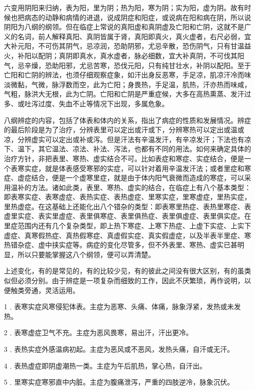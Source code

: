 \documentclass[12pt,UTF8]{ctexbook}
\begin{document}
六变用阴阳来归纳，表为阳，里为阴；热为阳，寒为阴；实为阳，虚为阴。故有时候也把病态的动静和病情的进退，说成阴症和阳症，或说病在阳和病在阴，所以说阴阳为八纲的纲领。但在临症上常说的真阳虚和真阴虚及亡阳和亡阴，这就不是广义的名词，前人解释真阳、真阴皆属于肾，真阳即真火，真火虚者，右尺必弱，宜大补元阳，不可伤其阴气，忌凉润，恐助阴邪，尤忌辛散，恐伤阴气，只有甘温益火，补阳以配阴；真阴即真水，真水虚者，脉必细数，宜大补真阴，不可伐其阳气，忌辛燥，恐助阳邪，尤忌苦寒，恐伐元阳，只有纯甘壮水，补阴以配阳。至于亡阳和亡阴的辨法，也须仔细观察症象，如汗出身反恶寒，手足凉，肌凉汗冷而味淡微黏，气微，脉浮数而空，此为亡阳；身畏热，手足温，肌热，汗亦热而味咸，气粗，脉洪大无根，此为亡阴。亡阳和亡阴是严重症候，大多在高热熏蒸、发汗过多、或吐泻过度、失血不止等情况下出现，多属危象。

八纲辨症的内容，包括了体表和体内的关系，指出了病症的性质和发展情况。辨症的最后阶段是为了治疗，分辨表里可以定出或汗或下，分辨寒热可以定出或温或凉，分辨虚实可以定出或补或泻。但是汗法有辛温发汗，有辛凉发汗；下法也有凉下、温下，其它温法、凉法、补法、泻法，也都有不同的用法。如何来确定具体的治疗方针，非把表里、寒热、虚实结合不可。比如表症和寒症、实症结合，便是一个表寒实症，就是体表感受寒邪的实症，可以针对着用辛温发汗法；或者里症和寒症、虚症结合，便是一个虚寒里症，就是由于体内阳气衰微而造成的寒症，可以采用温补的方法。诸如此类，表里、寒热、虚实的结合，在临症上有八个基本类型：即表寒实症、表寒虚症、表热实症、表热虚症、里寒实症，里寒虚症，里热实症，里热虚症。在这基础上还能化出八个错杂的类型：即表寒里热症、表热里寒症、表虚里实症、表实里虚症、表里俱寒症、表里俱热症、表里俱虚症、表里俱实症。在里症范围内还有几个复杂类型，即上热下寒症、上寒下热症、上虚下实症、上实下虚症、真寒假热症、真热假寒症、真虚假实症、真实假虚症，以及半表半里症、寒热错杂症、虚中挟实症等。病症的变化尽管多，但不外表里、寒热、虚实已甚明显，所以只要能掌握这八个纲领，便可以弄清楚。

上述变化，有的是常见的，有的比较少见，有的彼此之间没有很大区别，有的虽类似但必须分别。由于辨症是一项复杂而细致的工作，因此不厌繁琐，再作说明，以便触类旁通，灵活运用。

1﹒表寒实症风寒侵犯体表。主症为恶寒、头痛、体痛，脉象浮紧，发热或未发热。

2﹒表寒虚症卫气不充。主症为恶风畏寒，易出汗，汗出更冷。

3﹒表热实症外感温病初起。主症为恶风或不恶风，发热头痛，自汗或无汗。

4﹒表热虚症即阴虚潮热一类。主症为午后肌热，掌心热，自汗出。

5﹒里寒实症寒邪直中内脏。主症为腹痛泄泻，严重的四肢逆冷，脉象沉伏。
\end{document}
